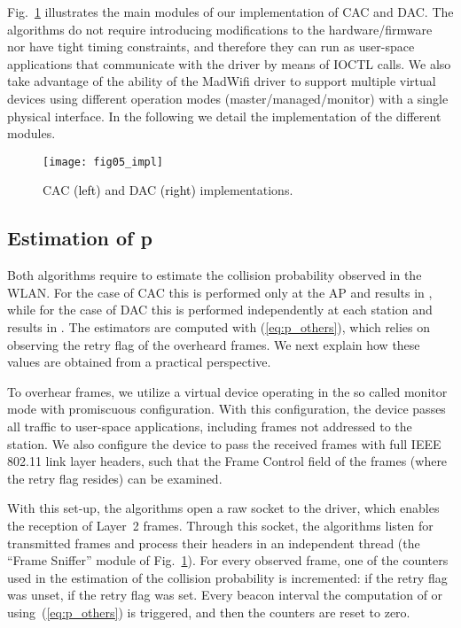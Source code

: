 \documentclass[a4paper,10pt]{article}
\newcommand{\revs}[1]{\textcolor{black}{#1}}
\begin{document}
Fig.~\ref{fig:implementation} illustrates the main modules of our implementation of CAC and DAC. The algorithms do not require introducing modifications to the hardware/firmware nor have tight timing constraints, and therefore they can run as user-space applications that communicate with the driver by means of {\ttfamily IOCTL} calls. We also take advantage of the ability of the MadWifi driver to support multiple virtual devices using different operation modes (master/managed/monitor) with a single physical interface. In the following we detail the implementation of the different modules. 

\begin{figure}\texttt{[image: fig05\_impl]}\caption{CAC \revs{(left)} and DAC \revs{(right)} implementations.}\label{fig:implementation}\end{figure}

\subsection{Estimation of p}

Both algorithms require to estimate the collision probability observed in the WLAN. For the case of CAC this is performed only at the AP and results in , while for the case of DAC this is performed independently at each station  and results in . The estimators are computed with (\ref{eq:p_others}), which relies on observing the retry flag of the overheard frames. We next explain how these values are obtained from a practical perspective. 

To overhear frames, we utilize a virtual device operating in the so called {\ttfamily monitor} mode with promiscuous configuration. With this configuration, the device passes all traffic to user-space applications, including frames not addressed to the station. We also configure the device to pass the received frames with full IEEE 802.11 link layer headers, such that the Frame Control field of the frames (where the retry flag resides) can be examined. 

With this set-up, the algorithms open a {\ttfamily raw} socket to the driver, which enables the reception of Layer~2 frames. Through this socket, the algorithms listen for transmitted frames and process their headers in an independent thread (the ``Frame Sniffer'' module of Fig.~\ref{fig:implementation}). For every observed frame, one of the counters used in the estimation of the collision probability is incremented:  if the retry flag was unset,  if the retry flag was set. Every beacon interval the computation of  or  using~(\ref{eq:p_others}) is triggered, and then the counters are reset to zero. 
\end{document}
